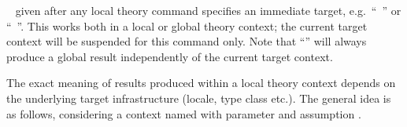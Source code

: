\begin{isabellebody}
\begin{isamarkuptext}
\begin{description}
  \item {}\hypertarget{keyword.in}{\hyperlink{keyword.in}{\mbox{}}}~ given after any
  local theory command specifies an immediate target, e.g.\
  ``\hyperlink{command.definition}{\mbox{}}~'' or ``\hyperlink{command.theorem}{\mbox{}}~''.  This works both in a local or
  global theory context; the current target context will be suspended
  for this command only.  Note that ``'' will
  always produce a global result independently of the current target
  context.

  \end{description}

  The exact meaning of results produced within a local theory context
  depends on the underlying target infrastructure (locale, type class
  etc.).  The general idea is as follows, considering a context named
  \isa{c} with parameter \isa{x} and assumption .
  

\end{isamarkuptext}
\end{isabellebody}
